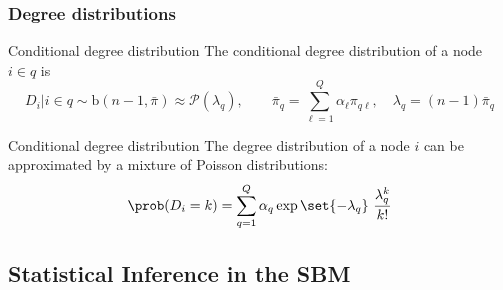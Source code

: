 \documentclass{beamer}\usepackage[]{graphicx}\usepackage[]{color}
\begin{document}
\begin{frame}
  \frametitle{Degree distributions}

  \begin{block}{Conditional degree distribution}
    The conditional degree distribution of a node $i\in q$ is
    \begin{equation*}
      D_i | i \in q \sim \mathrm{b}(n-1,\bar\pi) \approx \mathcal{P}(\lambda_q), \qquad \bar\pi_q = \sum_{\ell=1}^Q \alpha_\ell \pi_{q\ell}, \quad \lambda_q = (n-1)\bar\pi_q
    \end{equation*}
  \end{block}

  \vfill

  \begin{block}{Conditional degree distribution}
    The degree distribution of a node $i$ can be approximated by a mixture of Poisson distributions:
    \begin{equation*}
      \prob(D_i = k) = \sum_{q=1}^Q\alpha_q \exp{\set{-\lambda_q}} \ \frac{\lambda_q^k}{k !}
    \end{equation*}
  \end{block}

\end{frame}

\subsection{Statistical Inference in the SBM}
\end{document}
